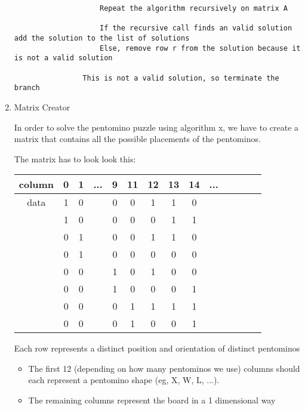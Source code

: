 \documentclass[10pt, a4paper]{article}
\begin{document}
\begin{enumerate}
\begin{mdframed}[backgroundcolor=light-gray, roundcorner=10pt,leftmargin=1, rightmargin=1, innerleftmargin=15, innertopmargin=15,innerbottommargin=15, outerlinewidth=1, linecolor=light-gray]
\begin{lstlisting}
					Repeat the algorithm recursively on matrix A

					If the recursive call finds an valid solution add the solution to the list of solutions
					Else, remove row r from the solution because it is not a valid solution
				
				This is not a valid solution, so terminate the branch

			\end{lstlisting}
	      \end{mdframed}

	\item Matrix Creator

	      In order to solve the pentomino puzzle using algorithm x, we have to create a matrix that contains all the possible placements of the pentominos.

	      The matrix has to look look this:

	      \begin{tabular}{ c | c  c  c  c   c | c  c  c c c c c c}
		      column & 0 & 1 & ... & 9 & 11 & 12 & 13 & 14 & ... \\
		      \hline
		      data   & 1 & 0 &     & 0 & 0  & 1  & 1  & 0        \\
		             & 1 & 0 &     & 0 & 0  & 0  & 1  & 1        \\
		             & 0 & 1 &     & 0 & 0  & 1  & 1  & 0        \\
		             & 0 & 1 &     & 0 & 0  & 0  & 0  & 0        \\
		             & 0 & 0 &     & 1 & 0  & 1  & 0  & 0        \\
		             & 0 & 0 &     & 1 & 0  & 0  & 0  & 1        \\
		             & 0 & 0 &     & 0 & 1  & 1  & 1  & 1        \\
		             & 0 & 0 &     & 0 & 1  & 0  & 0  & 1        \\
	      \end{tabular}

	      Each row represents a distinct position and orientation of distinct pentominos

	      \begin{itemize}
		      \item The first 12 (depending on how many pentominos we use) columns should each represent a pentomino shape (eg, X, W, L, ...).
		      \item The remaining columns represent the board in a 1 dimensional way


\end{itemize}
\end{enumerate}
\end{document}
